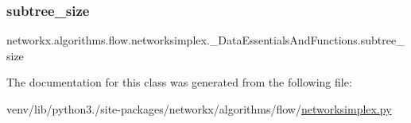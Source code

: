 \subsubsection{\texorpdfstring{subtree\+\_\+size}{subtree\_size}}
{\footnotesize\ttfamily networkx.\+algorithms.\+flow.\+networksimplex.\+\_\+\+Data\+Essentials\+And\+Functions.\+subtree\+\_\+size}



The documentation for this class was generated from the following file\+:\begin{DoxyCompactItemize}
\item 
venv/lib/python3./site-\/packages/networkx/algorithms/flow/\hyperlink{networksimplex_8py}{networksimplex.\+py}\end{DoxyCompactItemize}

